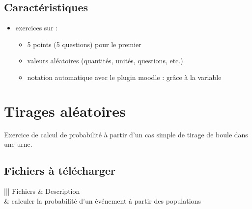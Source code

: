 \documentclass[letterpaper,10pt,french]{sphinxmanual}
\begin{document}
\subsection{Caractéristiques}
\label{\detokenize{proba-stat_fr_xe9quences:caracteristiques}}\begin{itemize}
\item {} 
exercices sur :
\begin{itemize}
\item {} 
5 points (5 questions) pour le premier

\item {} 
valeurs aléatoires (quantités, unités, questions, etc.)

\item {} 
notation automatique avec le plugin moodle : grâce à la variable 

\end{itemize}

\end{itemize}


\section{Tirages aléatoires}
\label{\detokenize{proba stat - tirage al_xe9a:tirages-aleatoires}}\label{\detokenize{proba stat - tirage al_xe9a::doc}}
Exercice de calcul de probabilité à partir d’un cas simple de tirage de boule dans une urne.



\subsection{Fichiers à télécharger}
\label{\detokenize{proba stat - tirage al_xe9a:fichiers-a-telecharger}}

\begin{savenotes}\sphinxattablestart
\centering
{}
\label{\detokenize{proba stat - tirage al_xe9a:id1}}
\sphinxaftercaption
\begin{tabular}[t]{|||}
\hline
\sphinxstyletheadfamily 
Fichiers
&\sphinxstyletheadfamily 
Description
\\
\hline
{}
&
calculer la probabilité d’un événement à partir des populations
\\
\hline
\end{tabular}
\par
\sphinxattableend\end{savenotes}
\end{document}
